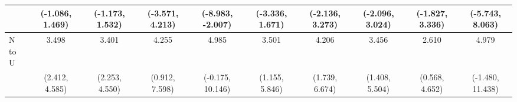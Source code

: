 {\begin{tabular}{l|c|c|c|c|c|c|c|c|c}
& {\scriptsize (-1.086, 1.469)}
& {\scriptsize (-1.173, 1.532)}
& {\scriptsize (-3.571, 4.213)}
& {\scriptsize (-8.983, -2.007)}
& {\scriptsize (-3.336, 1.671)}
& {\scriptsize (-2.136, 3.273)}
& {\scriptsize (-2.096, 3.024)}
& {\scriptsize (-1.827, 3.336)}
& {\scriptsize (-5.743, 8.063)}
\\ [0.1cm]
\hline
N to U
& 3.498 & 3.401 & 4.255 & 4.985 & 3.501 & 4.206 & 3.456 & 2.610 & 4.979 \\
& {\scriptsize (2.412, 4.585)}
& {\scriptsize (2.253, 4.550)}
& {\scriptsize (0.912, 7.598)}
& {\scriptsize (-0.175, 10.146)}
& {\scriptsize (1.155, 5.846)}
& {\scriptsize (1.739, 6.674)}
& {\scriptsize (1.408, 5.504)}
& {\scriptsize (0.568, 4.652)}
& {\scriptsize (-1.480, 11.438)}
\\ [0.1cm]
\hline
\hline
\end{tabular}
}
